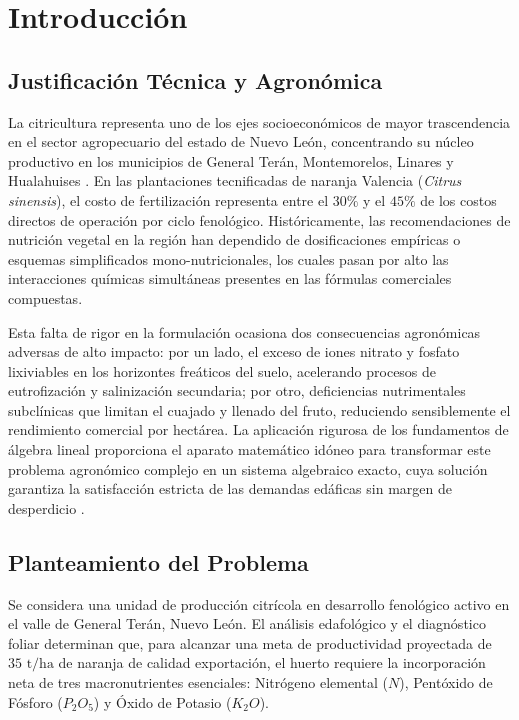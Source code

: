 \section{Introducción}

\subsection{Justificación Técnica y Agronómica}

La citricultura representa uno de los ejes socioeconómicos de mayor trascendencia en el sector agropecuario del estado de Nuevo León, concentrando su núcleo productivo en los municipios de General Terán, Montemorelos, Linares y Hualahuises \parencite{grossman2019}. En las plantaciones tecnificadas de naranja Valencia (\textit{Citrus sinensis}), el costo de fertilización representa entre el $30\%$ y el $45\%$ de los costos directos de operación por ciclo fenológico. Históricamente, las recomendaciones de nutrición vegetal en la región han dependido de dosificaciones empíricas o esquemas simplificados mono-nutricionales, los cuales pasan por alto las interacciones químicas simultáneas presentes en las fórmulas comerciales compuestas.

Esta falta de rigor en la formulación ocasiona dos consecuencias agronómicas adversas de alto impacto: por un lado, el exceso de iones nitrato y fosfato lixiviables en los horizontes freáticos del suelo, acelerando procesos de eutrofización y salinización secundaria; por otro, deficiencias nutrimentales subclínicas que limitan el cuajado y llenado del fruto, reduciendo sensiblemente el rendimiento comercial por hectárea. La aplicación rigurosa de los fundamentos de álgebra lineal proporciona el aparato matemático idóneo para transformar este problema agronómico complejo en un sistema algebraico exacto, cuya solución garantiza la satisfacción estricta de las demandas edáficas sin margen de desperdicio \parencite{lay2016, umn2024fertilizing}.

\subsection{Planteamiento del Problema}

Se considera una unidad de producción citrícola en desarrollo fenológico activo en el valle de General Terán, Nuevo León. El análisis edafológico y el diagnóstico foliar determinan que, para alcanzar una meta de productividad proyectada de $35\text{ t/ha}$ de naranja de calidad exportación, el huerto requiere la incorporación neta de tres macronutrientes esenciales: Nitrógeno elemental ($N$), Pentóxido de Fósforo ($P_2O_5$) y Óxido de Potasio ($K_2O$).

